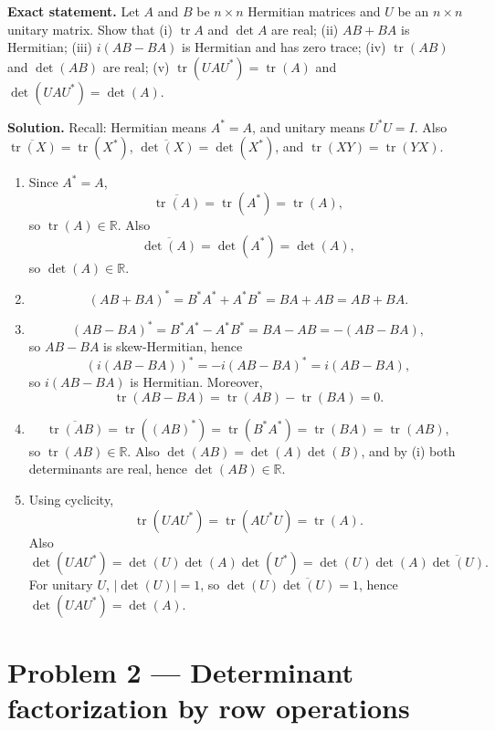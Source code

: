 \documentclass[12pt,a4paper]{article}
\theoremstyle{plain}
\theoremstyle{definition}      %
\begin{document}
\textbf{Exact statement.}
Let \(A\) and \(B\) be \(n\times n\) Hermitian matrices and \(U\) be an \(n\times n\) unitary matrix. Show that
(i) \(\operatorname{tr}A\) and \(\det A\) are real;
(ii) \(AB+BA\) is Hermitian;
(iii) \(i(AB-BA)\) is Hermitian and has zero trace;
(iv) \(\operatorname{tr}(AB)\) and \(\det(AB)\) are real;
(v) \(\operatorname{tr}(UAU^\ast)=\operatorname{tr}(A)\) and \(\det(UAU^\ast)=\det(A)\).

\textbf{Solution.}
Recall: Hermitian means \(A^\ast=A\), and unitary means \(U^\ast U=I\). Also
\(\overline{\operatorname{tr}(X)}=\operatorname{tr}(X^\ast)\),
\(\overline{\det(X)}=\det(X^\ast)\),
and \(\operatorname{tr}(XY)=\operatorname{tr}(YX)\).

\begin{enumerate}
	\item[(i)]
	Since \(A^\ast=A\),
	\[
	\overline{\operatorname{tr}(A)}=\operatorname{tr}(A^\ast)=\operatorname{tr}(A),
	\]
	so \(\operatorname{tr}(A)\in\mathbb R\). Also
	\[
	\overline{\det(A)}=\det(A^\ast)=\det(A),
	\]
	so \(\det(A)\in\mathbb R\).
	
	\item[(ii)]
	\[
	(AB+BA)^\ast=B^\ast A^\ast + A^\ast B^\ast=BA+AB=AB+BA.
	\]
	
	\item[(iii)]
	\[
	(AB-BA)^\ast=B^\ast A^\ast-A^\ast B^\ast=BA-AB=-(AB-BA),
	\]
	so \(AB-BA\) is skew-Hermitian, hence
	\[
	(i(AB-BA))^\ast=-i(AB-BA)^\ast=i(AB-BA),
	\]
	so \(i(AB-BA)\) is Hermitian. Moreover,
	\[
	\operatorname{tr}(AB-BA)=\operatorname{tr}(AB)-\operatorname{tr}(BA)=0.
	\]
	
	\item[(iv)]
	\[
	\overline{\operatorname{tr}(AB)}=\operatorname{tr}((AB)^\ast)=\operatorname{tr}(B^\ast A^\ast)=\operatorname{tr}(BA)=\operatorname{tr}(AB),
	\]
	so \(\operatorname{tr}(AB)\in\mathbb R\). Also \(\det(AB)=\det(A)\det(B)\), and by (i) both determinants are real, hence \(\det(AB)\in\mathbb R\).
	
	\item[(v)]
	Using cyclicity,
	\[
	\operatorname{tr}(UAU^\ast)=\operatorname{tr}(AU^\ast U)=\operatorname{tr}(A).
	\]
	Also
	\[
	\det(UAU^\ast)=\det(U)\det(A)\det(U^\ast)=\det(U)\det(A)\overline{\det(U)}.
	\]
	For unitary \(U\), \(|\det(U)|=1\), so \(\det(U)\overline{\det(U)}=1\), hence \(\det(UAU^\ast)=\det(A)\).
\end{enumerate}


\section*{Problem 2 — Determinant factorization by row operations}
\end{document}
